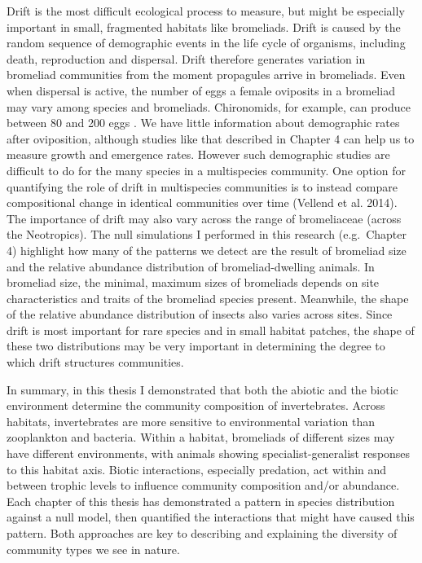 Drift is the most difficult ecological process to measure, but might be
especially important in small, fragmented habitats like bromeliads.
Drift is caused by the random sequence of demographic events in the life
cycle of organisms, including death, reproduction and dispersal. Drift
therefore generates variation in bromeliad communities from the moment
propagules arrive in bromeliads. Even when dispersal is active, the
number of eggs a female oviposits in a bromeliad may vary among species
and bromeliads. Chironomids, for example, can produce between 80 and 200
eggs \citep{chirobook}. We have little information about demographic
rates after oviposition, although studies like that described in Chapter
4 can help us to measure growth and emergence rates. However such
demographic studies are difficult to do for the many species in a
multispecies community. One option for quantifying the role of drift in
multispecies communities is to instead compare compositional change in
identical communities over time (Vellend et al. 2014). The importance of
drift may also vary across the range of bromeliaceae (across the
Neotropics). The null simulations I performed in this research
(e.g.~Chapter 4) highlight how many of the patterns we detect are the
result of bromeliad size and the relative abundance distribution of
bromeliad-dwelling animals. In bromeliad size, the minimal, maximum
sizes of bromeliads depends on site characteristics and traits of the
bromeliad species present. Meanwhile, the shape of the relative
abundance distribution of insects also varies across sites. Since drift
is most important for rare species and in small habitat patches, the
shape of these two distributions may be very important in determining
the degree to which drift structures communities.

In summary, in this thesis I demonstrated that both the abiotic and the
biotic environment determine the community composition of invertebrates.
Across habitats, invertebrates are more sensitive to environmental
variation than zooplankton and bacteria. Within a habitat, bromeliads of
different sizes may have different environments, with animals showing
specialist-generalist responses to this habitat axis. Biotic
interactions, especially predation, act within and between trophic
levels to influence community composition and/or abundance. Each chapter
of this thesis has demonstrated a pattern in species distribution
against a null model, then quantified the interactions that might have
caused this pattern. Both approaches are key to describing and
explaining the diversity of community types we see in nature.
